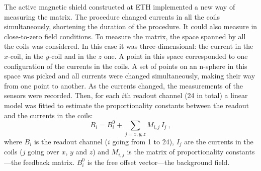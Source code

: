 The active magnetic shield constructed at ETH implemented a new way of measuring the matrix.
The procedure changed currents in all the coils simultaneously, shortening the duration of the procedure.
It could also measure in close-to-zero field conditions.
To measure the matrix, the space spanned by all the coils was considered.
In this case it was three-dimensional: the current in the $x$-coil, in the $y$-coil and in the $z$ one.
A point in this space corresponded to one configuration of the currents in the coils.
A set of points on an n-sphere in this space was picked and all currents were changed simultaneously, making their way from one point to another.
As the currents changed, the measurements of the sensors were recorded.
Then, for each $i$th readout channel (24 in total) a linear model was fitted to estimate the proportionality constants between the readout and the currents in the coils:
\begin{equation}
  \label{eq:SFC_matrix_linear_fits}
  B_i = B_i^0 + \sum_{j=x,y,z} M_{i,j} \, I_j \ ,
\end{equation}
where $B_i$ is the readout channel ($i$ going from 1 to 24), $I_j$ are the currents in the coils ($j$ going over $x$, $y$ and $z$) and $M_{i,j}$ is the matrix of proportionality constants---the feedback matrix.
$B_i^0$ is the free offset vector---the background field.

